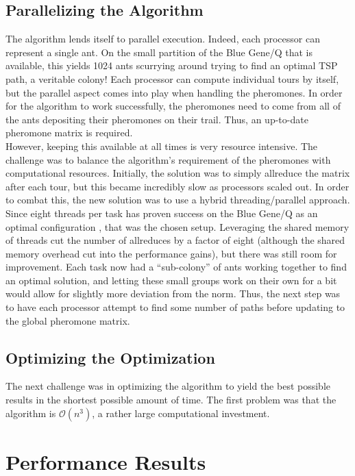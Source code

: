 \documentclass[twocolumn]{article}
\begin{document}
\subsection{Parallelizing the Algorithm}  \label{sec:parallel}

The algorithm lends itself to parallel execution. Indeed, each processor can
represent a single ant. On the small partition of the Blue Gene/Q that is
available, this yields 1024 ants scurrying around trying to find an optimal
TSP path, a veritable colony! Each processor can compute individual tours by
itself, but the parallel aspect comes into play when handling the pheromones.
In order for the algorithm to work successfully, the pheromones need to come from 
all of the ants depositing their pheromones on their trail. Thus, an up-to-date
pheromone matrix is required. \\

However, keeping this available at all times is
very resource intensive. The challenge was to balance the algorithm's requirement
of the pheromones with computational resources. Initially, the solution was to
simply allreduce the matrix after each tour, but this became incredibly 
slow as processors scaled out. In order to combat this, the new solution was
to use a hybrid threading/parallel approach. Since eight threads per task has 
proven success on the Blue Gene/Q as an optimal configuration \cite{lolours},
that was the chosen setup. Leveraging the shared memory of threads cut the 
number of allreduces by a factor of eight (although the shared memory overhead
cut into the performance gains), but there was still room for improvement. Each
task now had a ``sub-colony'' of ants working together to find an optimal 
solution, and letting these small groups work on their own for a bit would allow
for slightly more deviation from the norm. Thus, the next step was to have 
each processor attempt to find some number of paths before updating to the global 
pheromone matrix. 

\subsection{Optimizing the Optimization} \label{sec:opt}

The next challenge was in optimizing the algorithm to yield the best possible
results in the shortest possible amount of time. The first problem was that the
algorithm is $\mathcal{O}(n^3)$, a rather large computational investment. 


\section{Performance Results}
\end{document}
